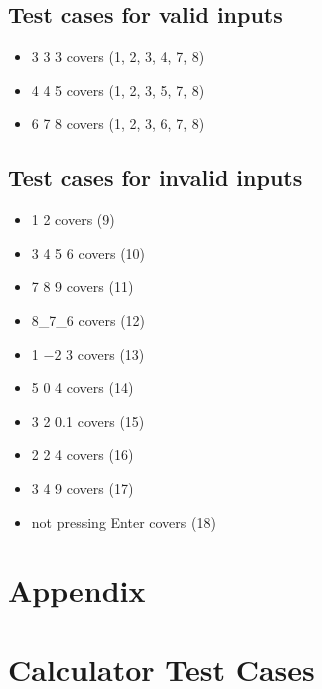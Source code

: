 \documentclass[letterpaper]{article}
\begin{document}
\subsection*{Test cases for valid inputs}
\begin{itemize}
    \item 3 3 3 covers (1, 2, 3, 4, 7, 8)
    \item 4 4 5 covers (1, 2, 3, 5, 7, 8)
    \item 6 7 8 covers (1, 2, 3, 6, 7, 8)
\end{itemize}

\subsection*{Test cases for invalid inputs}
\begin{itemize}
    \item 1 2 covers (9)
    \item 3 4 5 6 covers (10)
    \item 7 8       9 covers (11)
    \item 8\_7\_6 covers (12)
    \item 1 $-2$ 3 covers (13)
    \item 5 0 4 covers (14)
    \item 3 2 0.1 covers (15)
    \item 2 2 4 covers (16)
    \item 3 4 9 covers (17)
    \item not pressing Enter covers (18)
\end{itemize}


\appendix
\section*{Appendix}
\section{Calculator Test Cases} \label{calculatortestcases}


% 
\end{document}
